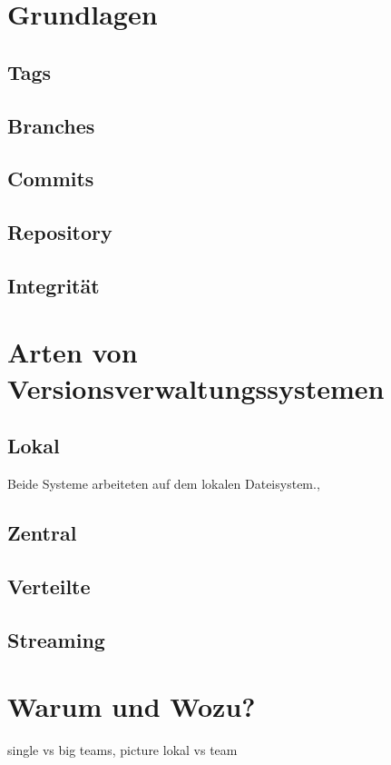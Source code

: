 \section{Grundlagen}\label{sec:Grundlagen}
\subsection{Tags}\label{sec:Tags}
\subsection{Branches}\label{sec:Branches}
\subsection{Commits}
\subsection{Repository}
\subsection{Integrität}
\section{Arten von Versionsverwaltungssystemen}
\subsection{Lokal}
Beide Systeme arbeiteten auf dem lokalen
Dateisystem.,
\subsection{Zentral}
\subsection{Verteilte}
\subsection{Streaming}

\section{Warum und Wozu?}
single vs big teams, picture lokal vs team
\label{sec:why}

